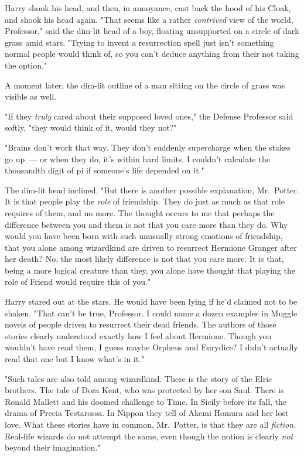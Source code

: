 Harry shook his head, and then, in annoyance, cast back the hood of his Cloak,
and shook his head again. "That seems like a rather \emph{contrived} view of
the world, Professor," said the dim-lit head of a boy, floating unsupported on
a circle of dark grass amid stars. "Trying to invent a resurrection spell just
isn't something normal people would think of, so you can't deduce anything from
their not taking the option."

A moment later, the dim-lit outline of a man sitting on the circle of grass was
visible as well.

"If they \emph{truly} cared about their supposed loved ones," the Defense
Professor said softly, "they would think of it, would they not?"

"Brains don't work that way. They don't suddenly supercharge when the stakes go
up~--- or when they do, it's within hard limits. I couldn't calculate the
thousandth digit of pi if someone's life depended on it."

The dim-lit head inclined. "But there is another possible explanation,
Mr.~Potter. It is that people play the \emph{role} of friendship. They do just
as much as that role requires of them, and no more. The thought occurs to me
that perhaps the difference between you and them is not that you care more than
they do. Why would you have been born with such unusually strong emotions of
friendship, that you alone among wizardkind are driven to resurrect Hermione
Granger after her death? No, the most likely difference is not that you care
more. It is that, being a more logical creature than they, you alone have
thought that playing the role of Friend would require this of you."

Harry stared out at the stars. He would have been lying if he'd claimed not to
be shaken. "That{\el} can't be true, Professor. I could name a dozen
examples in Muggle novels of people driven to resurrect their dead friends. The
authors of those stories clearly understood exactly how I feel about Hermione.
Though you wouldn't have read them, I guess{\el} maybe Orpheus and Eurydice?
I didn't actually read that one but I know what's in it."

"Such tales are also told among wizardkind. There is the story of the Elric
brothers. The tale of Dora Kent, who was protected by her son Saul. There is
Ronald Mallett and his doomed challenge to Time. In Sicily before its fall, the
drama of Precia Testarossa. In Nippon they tell of Akemi Homura and her lost
love. What these stories have in common, Mr.~Potter, is that they are all
\emph{fiction.} Real-life wizards do not attempt the same, even though the
notion is clearly \emph{not} beyond their imagination."

